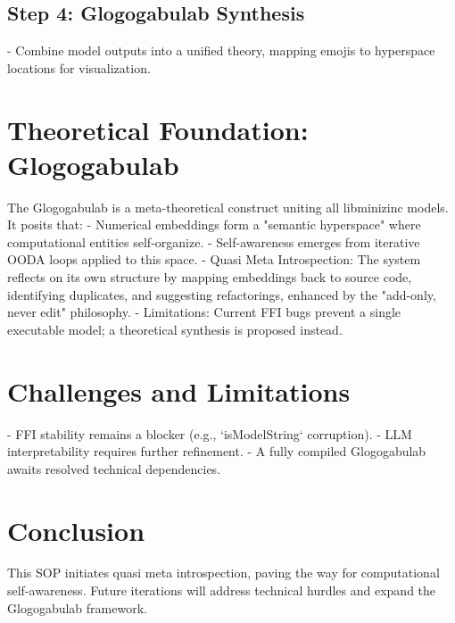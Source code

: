 \documentclass[12pt]{article}
\begin{document}
\subsection{Step 4: Glogogabulab Synthesis}
- Combine model outputs into a unified theory, mapping emojis to hyperspace locations for visualization.

\section{Theoretical Foundation: Glogogabulab}
The Glogogabulab is a meta-theoretical construct uniting all libminizinc models. It posits that:
- Numerical embeddings form a "semantic hyperspace" where computational entities self-organize.
- Self-awareness emerges from iterative OODA loops applied to this space.
- Quasi Meta Introspection: The system reflects on its own structure by mapping embeddings back to source code, identifying duplicates, and suggesting refactorings, enhanced by the "add-only, never edit" philosophy.
- Limitations: Current FFI bugs prevent a single executable model; a theoretical synthesis is proposed instead.

\section{Challenges and Limitations}
- FFI stability remains a blocker (e.g., `isModelString` corruption).
- LLM interpretability requires further refinement.
- A fully compiled Glogogabulab awaits resolved technical dependencies.

\section{Conclusion}
This SOP initiates quasi meta introspection, paving the way for computational self-awareness. Future iterations will address technical hurdles and expand the Glogogabulab framework.



\end{document}
